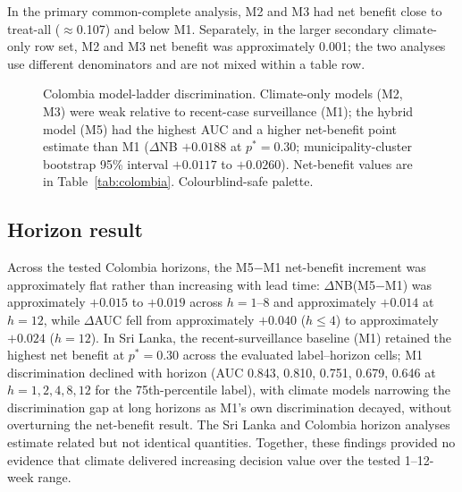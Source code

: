 \documentclass[11pt,a4paper]{article}
\begin{document}
\noindent In the primary common-complete analysis, M2 and M3 had net benefit close to treat-all ($\approx$0.107) and below M1. Separately, in the larger secondary climate-only row set, M2 and M3 net benefit was approximately 0.001; the two analyses use different denominators and are not mixed within a table row.

\begin{figure}[htbp]
\centering
{}
\caption{Colombia model-ladder discrimination. Climate-only models (M2, M3) were weak relative to recent-case surveillance (M1); the hybrid model (M5) had the highest AUC and a higher net-benefit point estimate than M1 ($\Delta$NB $+0.0188$ at $p^*=0.30$; municipality-cluster bootstrap 95\% interval $+0.0117$ to $+0.0260$). Net-benefit values are in Table~\ref{tab:colombia}. Colourblind-safe palette.}
\label{fig:colombia}
\end{figure}

\subsection{Horizon result}
Across the tested Colombia horizons, the M5$-$M1 net-benefit increment was approximately flat rather than increasing with lead time: $\Delta$NB(M5$-$M1) was approximately $+0.015$ to $+0.019$ across $h=1$--8 and approximately $+0.014$ at $h=12$, while $\Delta$AUC fell from approximately $+0.040$ ($h\le4$) to approximately $+0.024$ ($h=12$). In Sri Lanka, the recent-surveillance baseline (M1) retained the highest net benefit at $p^*=0.30$ across the evaluated label--horizon cells; M1 discrimination declined with horizon (AUC 0.843, 0.810, 0.751, 0.679, 0.646 at $h=1,2,4,8,12$ for the 75th-percentile label), with climate models narrowing the discrimination gap at long horizons as M1's own discrimination decayed, without overturning the net-benefit result. The Sri Lanka and Colombia horizon analyses estimate related but not identical quantities. Together, these findings provided no evidence that climate delivered increasing decision value over the tested 1--12-week range.
\end{document}
